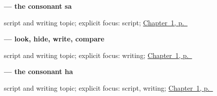 \noindent\begin{minipage}[t]{\linewidth}
\raggedright
\textbf{ — the consonant sa}\par
\footnotesize script and writing topic; explicit focus: script; \hyperref[ch:first-greeting-script]{Chapter~1, p.~\pageref*{ch:first-greeting-script}}
\end{minipage}\par\smallskip

\noindent\begin{minipage}[t]{\linewidth}
\raggedright
\textbf{ — look, hide, write, compare}\par
\footnotesize script and writing topic; explicit focus: writing; \hyperref[ch:first-greeting-script]{Chapter~1, p.~\pageref*{ch:first-greeting-script}}
\end{minipage}\par\smallskip

\noindent\begin{minipage}[t]{\linewidth}
\raggedright
\textbf{ — the consonant ha}\par
\footnotesize script and writing topic; explicit focus: script, writing; \hyperref[ch:first-greeting-script]{Chapter~1, p.~\pageref*{ch:first-greeting-script}}
\end{minipage}\par\smallskip
